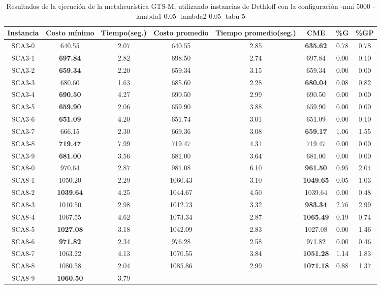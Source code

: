 \begin{table}[h]
\caption{Resultados de la ejecución de la metaheurística GTS-M, utilizando instancias de Dethloff con la configuración -mni 5000 -lambda1 0.05 -lambda2 0.05 -tabu 5}
\centering
\small
\begin{tabular}{c c c c c c c c}
\hline\hline
Instancia & Costo mínimo & Tiempo(seg.) & Costo promedio & Tiempo promedio(seg.) & CME & \%G & \%GP \\ [0.5ex]
\hline
SCA3-0 & 640.55 & 2.07 & 
640.55 & 2.85 & \bf{635.62} & 
0.78 & 0.78\\SCA3-1 & \bf{697.84} & 2.82 & 
698.50 & 2.74 & 697.84 & 0.00
 & 0.10\\SCA3-2 & \bf{659.34} & 2.20 & 
659.34 & 3.15 & 659.34 & 0.00
 & 0.00\\
SCA3-3 & 680.60 & 1.63 & 
685.60 & 2.28 & \bf{680.04} & 
0.08 & 0.82\\SCA3-4 & \bf{690.50} & 4.27 & 
690.50 & 2.99 & 690.50 & 0.00
 & 0.00\\
SCA3-5 & \bf{659.90} & 2.06 & 
659.90 & 3.88 & 659.90 & 0.00
 & 0.00\\
SCA3-6 & \bf{651.09} & 4.20 & 
651.74 & 3.01 & 651.09 & 0.00
 & 0.10\\SCA3-7 & 666.15 & 2.30 & 
669.36 & 3.08 & \bf{659.17} & 
1.06 & 1.55\\SCA3-8 & \bf{719.47} & 7.99 & 
719.47 & 4.31 & 719.47 & 0.00
 & 0.00\\
SCA3-9 & \bf{681.00} & 3.56 & 
681.00 & 3.64 & 681.00 & 0.00
 & 0.00\\
SCA8-0 & 970.64 & 2.87 & 
981.08 & 6.10 & \bf{961.50} & 
0.95 & 2.04\\SCA8-1 & 1050.20 & 2.29 & 
1060.43 & 3.10 & \bf{1049.65} & 
0.05 & 1.03\\SCA8-2 & \bf{1039.64} & 4.25 & 
1044.67 & 4.50 & 1039.64 & 0.00
 & 0.48\\SCA8-3 & 1010.50 & 2.98 & 
1012.73 & 3.32 & \bf{983.34} & 
2.76 & 2.99\\SCA8-4 & 1067.55 & 4.62 & 
1073.34 & 2.87 & \bf{1065.49} & 
0.19 & 0.74\\SCA8-5 & \bf{1027.08} & 3.18 & 
1042.09 & 2.83 & 1027.08 & 0.00
 & 1.46\\SCA8-6 & \bf{971.82} & 2.34 & 
976.28 & 2.58 & 971.82 & 0.00
 & 0.46\\SCA8-7 & 1063.22 & 4.13 & 
1070.55 & 3.84 & \bf{1051.28} & 
1.14 & 1.83\\SCA8-8 & 1080.58 & 2.04 & 
1085.86 & 2.99 & \bf{1071.18} & 
0.88 & 1.37\\SCA8-9 & \bf{1060.50} & 3.79 & 

\end{tabular}
\end{table}
